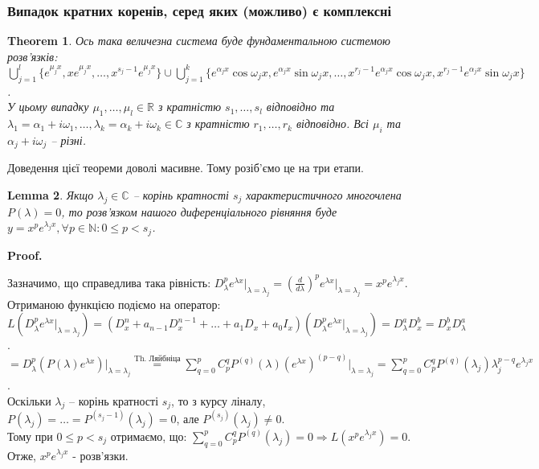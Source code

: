 \documentclass[a4paper, 10pt]{article}
\makeatletter
\def\qed{$\blacksquare$}
\theoremstyle{theoremdd}
\newtheorem{theorem}{Theorem}[subsection]
\theoremstyle{theoremdd}
\theoremstyle{theoremdd}
\theoremstyle{theoremdd}
\theoremstyle{theoremdd}
\theoremstyle{theoremdd}
\theoremstyle{theoremdd}
\newtheorem{lemma}[theorem]{Lemma}
\theoremstyle{theoremdd}
\renewenvironment{proof}[1][Proof.\\]{\par
\pushQED{\hfill \qed}%
\normalfont \topsep6\p@\@plus6\p@\relax
\trivlist
\item\relax
{\bfseries
#1\@addpunct{.}}\hspace\labelsep\ignorespaces
}{%
\popQED\endtrivlist\@endpefalse
}
\makeatother
\begin{document}
\subsubsection{Випадок кратних коренів, серед яких (можливо) є комплексні}
\begin{theorem}
Ось така величезна система буде фундаментальною системою розв'язків: \\
$ \displaystyle \bigcup_{j=1}^l \{e^{\mu_j x}, x e^{\mu_j x}, \dots, x^{s_j-1}e^{\mu_j x}\} \cup \displaystyle \bigcup_{j=1}^k \{e^{\alpha_j x} \cos \omega_j x, e^{\alpha_j x} \sin \omega_j x, \dots, x^{r_j-1}e^{\alpha_j x} \cos \omega_j x, x^{r_j-1}e^{\alpha_j x} \sin \omega_j x\}$. \\
У цьому випадку $\mu_1, \dots, \mu_l \in \mathbb{R}$ з кратністю $s_1, \dots, s_l$ відповідно та $\lambda_1 = \alpha_1 + i\omega_1, \dots, \lambda_k = \alpha_k + i\omega_k \in \mathbb{C}$ з кратністю $r_1, \dots, r_k$ відповідно. Всі $\mu_i$ та $\alpha_j + i \omega_j$ -- різні.
\end{theorem}

Доведення цієї теореми доволі масивне. Тому розіб'ємо це на три етапи.
\begin{lemma}
Якщо $\lambda_j \in \mathbb{C}$ -- корінь кратності $s_j$ характеристичного многочлена $P(\lambda) = 0$, то розв'язком нашого диференціального рівняння буде $\displaystyle y = x^p e^{\lambda_j x}, \forall p \in \mathbb{N}: 0 \leq p < s_j$.
\end{lemma}

\begin{proof}
Зазначимо, що справедлива така рівність: $\displaystyle  D^p_{\lambda} {e^{\lambda x}} \Big|_{\lambda = \lambda_j} = \left(\frac{d}{d \lambda}\right)^p {e^{\lambda x}} \Big|_{\lambda = \lambda_j} = x^p e^{\lambda_j x}$.\\
Отриманою функцією подіємо на оператор:\\
$L\left(D^p_{\lambda} {e^{\lambda x}} \Big|_{\lambda = \lambda_j} \right) = \left(D^n_x + a_{n-1}D^{n-1}_x+\dots+a_1D_x +a_0I_x \right) \left(D^p_{\lambda} {e^{\lambda x}} \Big|_{\lambda = \lambda_j} \right) = D^a_\lambda D^b_x = D^b_x D^a_\lambda$.\\
$\displaystyle = D^p_{\lambda} \left(P(\lambda) e^{\lambda x} \right) \Big|_{\lambda = \lambda_j} \overset{\text{Th. Ляйбніца}}{=} \sum_{q=0}^p C_p^q P^{(q)}(\lambda) (e^{\lambda x})^{(p-q)} \Big|_{\lambda = \lambda_j} = \sum_{q=0}^p C_p^q P^{(q)}(\lambda_j) \lambda_j^{p-q} e^{\lambda_j x}$.\\
Оскільки $\lambda_j$ -- корінь кратності $s_j$, то з курсу ліналу, $P(\lambda_j) = \dots = P^{(s_j - 1)}(\lambda_j) = 0$, але $P^{(s_j)}(\lambda_j) \neq 0$.\\
Тому при $0 \leq p < s_j$ отримаємо, що: $\displaystyle \sum_{q=0}^p C_p^q P^{(q)}(\lambda_j) = 0 \Rightarrow L(x^p e^{\lambda_j x}) = 0$.\\
Отже, $x^p e^{\lambda_j x}$ - розв'язки.
\end{proof}
\end{document}
